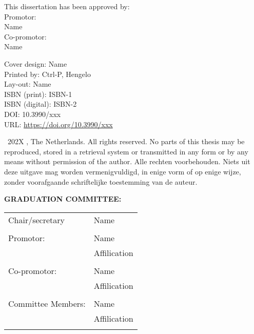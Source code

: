 \begin{titlepage}
\begin{center}
    
        \clearpage

\thispagestyle{empty}
    \raggedright 
    
    This dissertation has been approved by:\\[2\baselineskip]
    
    Promotor:\\
    Name\\
    \vspace{0.5cm}
    Co-promotor:\\
    Name
    
    

    
    \vfill
    Cover design: Name\\
    Printed by: Ctrl-P, Hengelo\\
    Lay-out: Name\\
    ISBN (print): ISBN-1\\ 
    ISBN (digital): ISBN-2\\ 
    DOI: 10.3990/xxx\\
    URL: \url{https://doi.org/10.3990/xxx}  \\[2\baselineskip]
   
   
  \textcopyright\ 202X \theauthor, The Netherlands. 
  All rights reserved. 
  No parts of this thesis may be reproduced, stored in a retrieval system or transmitted in any form or by any means without permission of the author. 
  Alle rechten voorbehouden. 
  Niets uit deze uitgave mag worden vermenigvuldigd, in enige vorm of op enige wijze, zonder voorafgaande schriftelijke toestemming van de auteur.
   
   
   
   
   
   
    \clearpage
    \thispagestyle{empty}
    \raggedright
    \normalsize
    \textbf{GRADUATION COMMITTEE:}\\[2\baselineskip]
    \begin{table}[hb]
    \begin{tabular}{ll}
    Chair/secretary  & Name \\\\   
    Promotor:          & Name\\ & Affilication    \\\\
    Co-promotor:          & Name\\ & Affilication    \\\\
    Committee Members:             & Name\\ & Affilication   \\\\               


\end{tabular}
\end{table}
\end{center}
\end{titlepage}
